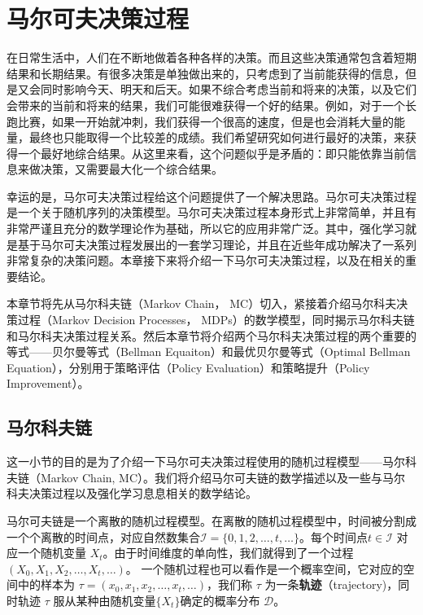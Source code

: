\section{马尔可夫决策过程}

在日常生活中，人们在不断地做着各种各样的决策。而且这些决策通常包含着短期结果和长期结果。有很多决策是单独做出来的，只考虑到了当前能获得的信息，但是又会同时影响今天、明天和后天。如果不综合考虑当前和将来的决策，以及它们会带来的当前和将来的结果，我们可能很难获得一个好的结果。例如，对于一个长跑比赛，如果一开始就冲刺，我们获得一个很高的速度，但是也会消耗大量的能量，最终也只能取得一个比较差的成绩。我们希望研究如何进行最好的决策，来获得一个最好地综合结果。从这里来看，这个问题似乎是矛盾的：即只能依靠当前信息来做决策，又需要最大化一个综合结果。

幸运的是，马尔可夫决策过程给这个问题提供了一个解决思路。马尔可夫决策过程是一个关于随机序列的决策模型。马尔可夫决策过程本身形式上非常简单，并且有非常严谨且充分的数学理论作为基础，所以它的应用非常广泛。其中，强化学习就是基于马尔可夫决策过程发展出的一套学习理论，并且在近些年成功解决了一系列非常复杂的决策问题。本章接下来将介绍一下马尔可夫决策过程，以及在相关的重要结论。

本章节将先从马尔科夫链（Markov Chain， MC）切入，紧接着介绍马尔科夫决策过程（Markov Decision Processes， MDPs）的数学模型，同时揭示马尔科夫链和马尔科夫决策过程关系。然后本章节将介绍两个马尔科夫决策过程的两个重要的等式——贝尔曼等式（Bellman Equaiton）和最优贝尔曼等式（Optimal Bellman Equation），分别用于策略评估（Policy Evaluation）和策略提升（Policy Improvement）。

\subsection{马尔科夫链}

这一小节的目的是为了介绍一下马尔可夫决策过程使用的随机过程模型——马尔科夫链（Markov Chain, MC）。我们将介绍马尔可夫链的数学描述以及一些与马尔科夫决策过程以及强化学习息息相关的数学结论\cite{kass1998markov}。

马尔可夫链是一个离散的随机过程模型。在离散的随机过程模型中，时间被分割成一个个离散的时间点，对应自然数集合$\mathcal{I} = \{0, 1, 2, \ldots, t, \ldots\}$。每个时间点$t \in \mathcal{I}$ 对应一个随机变量 $X_t$。由于时间维度的单向性，我们就得到了一个过程$(X_0, X_1, X_2, \ldots, X_t, \ldots)$。 一个随机过程也可以看作是一个概率空间，它对应的空间中的样本为 $\tau=(x_0, x_1, x_2, \ldots, x_t, \ldots)$，我们称 $\tau$ 为一条\textbf{轨迹}（trajectory)，同时轨迹 $\tau$ 服从某种由随机变量$\{X_t\}$确定的概率分布 $\mathcal{D}$。

